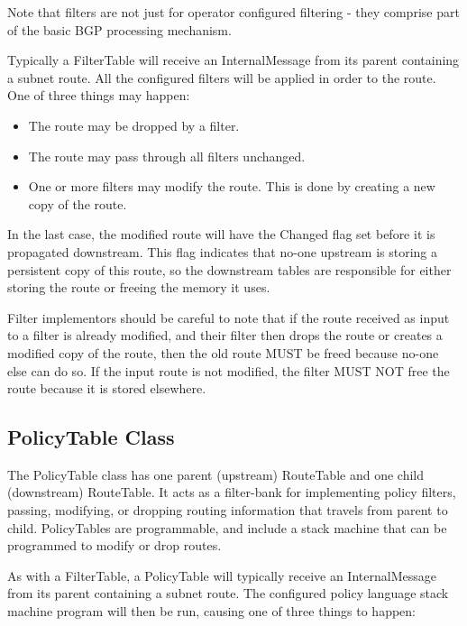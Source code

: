 \documentclass[11pt]{article}
\begin{document}
Note that filters are not just for operator configured filtering -
they comprise part of the basic BGP processing mechanism.

Typically a FilterTable will receive an InternalMessage from its
parent containing a subnet route.  All the configured filters will be
applied in order to the route.  One of three things may happen:

\begin{itemize}

  \item The route may be dropped by a filter.

  \item The route may pass through all filters unchanged.

  \item One or more filters may modify the route.  This is done by
  creating a new copy of the route.

\end{itemize}

In the last case, the modified route will have the Changed flag set
before it is propagated downstream.  This flag indicates that no-one
upstream is storing a persistent copy of this route, so the downstream
tables are responsible for either storing the route or freeing the
memory it uses.

Filter implementors should be careful to note that if the route
received as input to a filter is already modified, and their filter
then drops the route or creates a modified copy of the route, then the
old route MUST be freed because no-one else can do so.  If the input
route is not modified, the filter MUST NOT free the route because it
is stored elsewhere.

\subsection{PolicyTable Class}

The PolicyTable class has one parent (upstream) RouteTable and one
child (downstream) RouteTable.  It acts as a filter-bank for
implementing policy filters, passing, modifying, or dropping routing
information that travels from parent to child.  PolicyTables are
programmable, and include a stack machine that can be programmed to
modify or drop routes.  

As with a FilterTable, a PolicyTable will typically receive an
InternalMessage from its parent containing a subnet route.  The
configured policy language stack machine program will then be run,
causing one of three things to happen:
\end{document}
